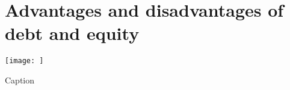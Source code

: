 \section{Advantages and disadvantages of debt and equity}
\label{app:de}

\begin{table}[]
    \centering
    \texttt{[image: ]}
    \caption{Caption}
    \label{tab:my_label}
\end{table}